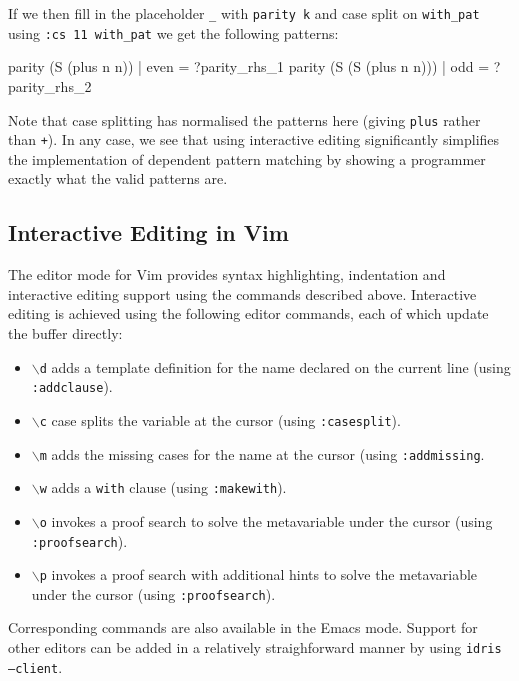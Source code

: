 \noindent
If we then fill in the placeholder \texttt{\_} with \texttt{parity k} and
case split on \texttt{with\_pat} using \texttt{:cs 11 with\_pat} we get
the following patterns:

\begin{code}
  parity (S (plus n n)) | even = ?parity_rhs_1
  parity (S (S (plus n n))) | odd = ?parity_rhs_2
\end{code}

\noindent
Note that case splitting has normalised the patterns here (giving
\texttt{plus} rather than \texttt{+}). In any case,
we see that using interactive editing significantly simplifies the
implementation of dependent pattern matching by showing a programmer exactly
what the valid patterns are.

\subsection{Interactive Editing in Vim}

The editor mode for Vim provides syntax highlighting, indentation and
interactive editing support using the commands described above. Interactive
editing is achieved using the following editor commands, each of which
update the buffer directly:

\begin{itemize}
\item \texttt{$\backslash$d} adds a template definition for the name declared
on the current line (using \texttt{:addclause}).
\item \texttt{$\backslash$c} case splits the variable at the cursor
(using \texttt{:casesplit}).
\item \texttt{$\backslash$m} adds the missing cases for the name at the
cursor (using \texttt{:addmissing}.
\item \texttt{$\backslash$w} adds a \texttt{with} clause (using
\texttt{:makewith}). 
\item \texttt{$\backslash$o} invokes a proof search to solve the metavariable
under the cursor (using \texttt{:proofsearch}).
\item \texttt{$\backslash$p} invokes a proof search with additional hints
to solve the metavariable
under the cursor (using \texttt{:proofsearch}).
\end{itemize}

\noindent
Corresponding commands are also available in the Emacs mode. Support for
other editors can be added in a relatively straighforward manner by using
\texttt{idris --client}.


